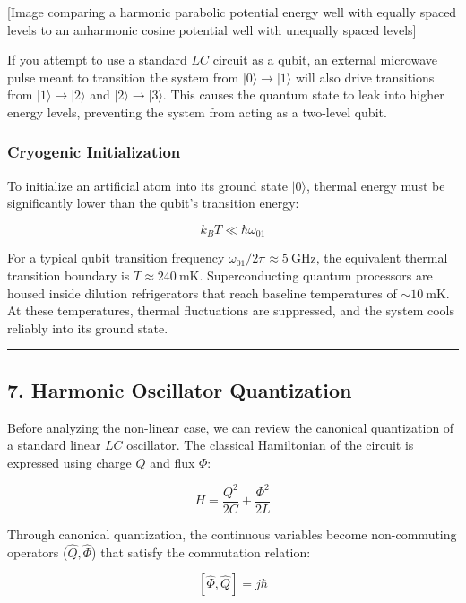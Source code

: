 \documentclass[
]{article}
\begin{document}
{[}Image comparing a harmonic parabolic potential energy well with
equally spaced levels to an anharmonic cosine potential well with
unequally spaced levels{]}

If you attempt to use a standard \(LC\) circuit as a qubit, an external
microwave pulse meant to transition the system from
\(|0\rangle \to |1\rangle\) will also drive transitions from
\(|1\rangle \to |2\rangle\) and \(|2\rangle \to |3\rangle\). This causes
the quantum state to leak into higher energy levels, preventing the
system from acting as a two-level qubit.

\subsubsection{Cryogenic Initialization}\label{cryogenic-initialization}

To initialize an artificial atom into its ground state \(|0\rangle\),
thermal energy must be significantly lower than the qubit's transition
energy:

\[k_B T \ll \hbar \omega_{01}\]

For a typical qubit transition frequency
\(\omega_{01}/2\pi \approx 5\ \text{GHz}\), the equivalent thermal
transition boundary is \(T \approx 240\ \text{mK}\). Superconducting
quantum processors are housed inside dilution refrigerators that reach
baseline temperatures of \(\sim 10\ \text{mK}\). At these temperatures,
thermal fluctuations are suppressed, and the system cools reliably into
its ground state.

\begin{center}\rule{0.5\linewidth}{0.5pt}\end{center}

\subsection{7. Harmonic Oscillator
Quantization}\label{harmonic-oscillator-quantization}

Before analyzing the non-linear case, we can review the canonical
quantization of a standard linear \(LC\) oscillator. The classical
Hamiltonian of the circuit is expressed using charge \(Q\) and flux
\(\Phi\):

\[H = \frac{Q^2}{2C} + \frac{\Phi^2}{2L}\]

Through canonical quantization, the continuous variables become
non-commuting operators (\(\hat{Q}, \hat{\Phi}\)) that satisfy the
commutation relation:

\[[\hat{\Phi}, \hat{Q}] = j\hbar\]
\end{document}

